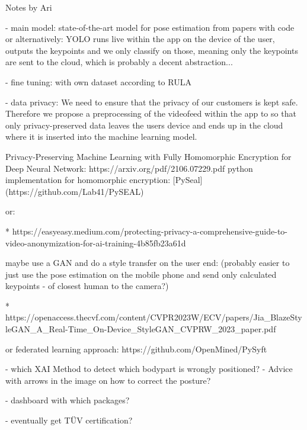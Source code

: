 
Notes by Ari

- main model:
state-of-the-art model for pose estimation from papers with code
or alternatively:
YOLO runs live within the app on the device of the user, outputs the keypoints and we only classify on those, meaning only the keypoints are sent to the cloud, which is probably a decent abstraction...

- fine tuning:
with own dataset according to RULA

- data privacy:
We need to ensure that the privacy of our customers is kept safe. Therefore we propose a preprocessing of the videofeed within the app to so that only privacy-preserved data leaves the users device and ends up in the cloud where it is inserted into the machine learning model.

Privacy-Preserving Machine Learning with Fully Homomorphic Encryption for Deep Neural Network:
https://arxiv.org/pdf/2106.07229.pdf
python implementation for homomorphic encryption: [PySeal](https://github.com/Lab41/PySEAL)

or:

* https://easyeasy.medium.com/protecting-privacy-a-comprehensive-guide-to-video-anonymization-for-ai-training-4b85fb23a61d

maybe use a GAN and do a style transfer on the user end: (probably easier to just use the pose estimation on the mobile phone and send only calculated keypoints - of closest human to the camera?)

* https://openaccess.thecvf.com/content/CVPR2023W/ECV/papers/Jia_BlazeStyleGAN_A_Real-Time_On-Device_StyleGAN_CVPRW_2023_paper.pdf

or federated learning approach:
https://github.com/OpenMined/PySyft

- which XAI Method to detect which bodypart is wrongly positioned?
- Advice with arrows in the image on how to correct the posture?

- dashboard with which packages?

- eventually get TÜV certification?
